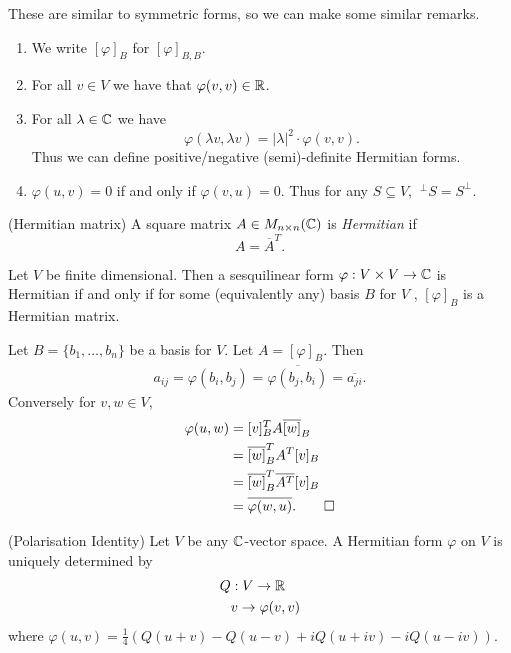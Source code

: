 \documentclass{article}
\begin{document}
\begin{remark}
  These are similar to symmetric forms, so we can make some similar remarks.
  \begin{enumerate}
	  \item We write $ [\varphi]_B $ for $ [\varphi]_{B,B} $.
	  \item For all $ v\in V $ we have that $ \varphi(v,v)\in \mathbb{R} $.
	  \item For all $ \lambda\in \mathbb{C} $ we have
		  \[
		    \varphi(\lambda v, \lambda v)=|\lambda|^2\cdot\varphi(v,v).
		  \]
		  Thus we can define positive/negative (semi)-definite Hermitian forms.
	  \item $ \varphi(u,v)=0 $ if and only if $ \varphi(v,u)=0 $. Thus for any $ S\subseteq V $, $ \ ^\perp S=S^\perp $.
  \end{enumerate}
\end{remark}
\begin{definition}
	(Hermitian matrix) A square matrix $ A\in M_{n\times n}(\mathbb{C}) $ is \textit{Hermitian} if
	\[
	  A=\overline A^T.
	\]
\end{definition}
\begin{lemma}
	Let $ V $ be finite dimensional. Then a sesquilinear form $ \varphi:V\times V\to \mathbb{C} $ is Hermitian if and only if for some (equivalently any) basis $ B $ for $ V $ , $ [\varphi]_B $ is a Hermitian matrix.
\end{lemma}
\pf Let $ B=\{b_1,\dots, b_n\} $ be a basis for $ V $. Let $ A=[\varphi]_B $. Then
\begin{align*}
	a_{ij}=\varphi(b_i,b_j)=\overline{\varphi(b_j,b_i)}=\overline{a_{ji}}.
\end{align*}
Conversely for $ v,w\in V $,
\begin{align*}
	\varphi(u,w)&=[v]^T_BA\overline{[w]}_B\\
		    &=\overline{[w]}_B^TA^T[v]_B\\
		    &=\overline{[w]}_B^T\overline{A^T}[v]_B\\
		    &=\overline{\varphi(w,u)}.\qed
\end{align*}
\begin{proposition}
	(Polarisation Identity) Let $ V $ be any $ \mathbb{C} $-vector space. A Hermitian form $ \varphi $ on $ V $ is uniquely determined by
	\begin{align*}
		Q &: V\to \mathbb{R}\\
		  &v\to \varphi(v,v)
	\end{align*}
	where $ \varphi(u,v)=\frac 14(Q(u+v)-Q(u-v)+iQ(u+iv)-iQ(u-iv)) $.
\end{proposition}
\end{document}
